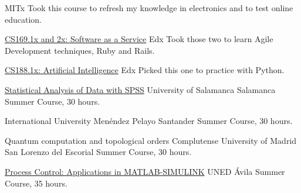\documentclass[11pt,a4paper,roman]{moderncv}
\begin{document}
	{MITx}
	{}
	{}
	{Took this course to refresh my knowledge in electronics and to test online education.} 

	{\href{https://www.edx.org/courses/BerkeleyX/CS169.1x/2013_Spring/about}
	{CS169.1x and 2x: Software as a Service}}
	{Edx}
	{}
	{}
	{Took those two to learn Agile Development techniques, Ruby and Rails.} 

	{\href{https://6002x.mitx.mit.edu/}
	{CS188.1x: Artificial Intelligence}}
	{Edx}
	{}
	{}
	{Picked this one to practice with Python.} 


	{\href{http://biplot.usal.es/verano/analisis-estadistico-de-dat.html}
	{Statistical Analysis of Data with SPSS}}
	{University of Salamanca}
	{Salamanca}
	{}
	{Summer Course, 30 hours.}

	{International University Men\'endez Pelayo}
	{Santander}
	{}
	{Summer Course, 30 hours.}


	{Quantum computation and topological orders}
	{Complutense University of Madrid}
	{San Lorenzo del Escorial}
	{}
	{Summer Course, 30 hours.}


					{\href{http://portal.uned.es/portal/page?_pageid=93,22547880&_dad=portal&_schema=PORTAL&idCurso=042}		{Process Control: Applications in MATLAB-SIMULINK}}
	{UNED}
	{\'Avila}
	{}
	{Summer Course, 35 hours.}
\end{document}
